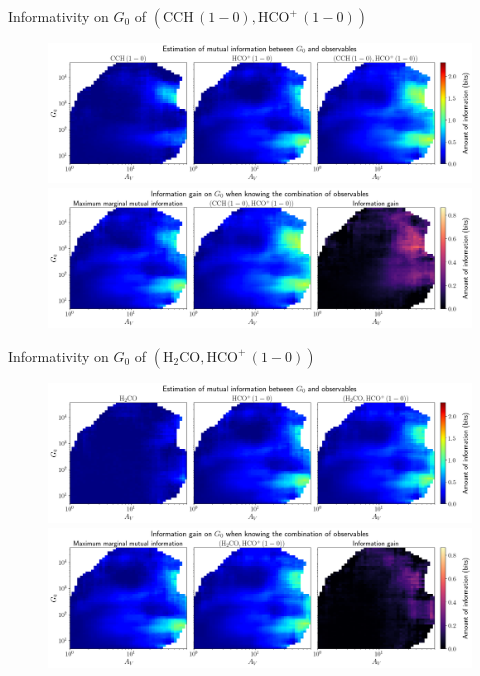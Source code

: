 \documentclass{beamer}
\begin{document}
\begin{frame}{Informativity on $G_0$ of $\left(\mathrm{CCH\,(1-0)},\mathrm{HCO^+\,(1-0)}\right)$}
    \begin{figure}
        \centering
        \includegraphics[width=0.95\linewidth]{../mi/g0__cch10_hcop10_mi.png}
        \vfill
        \includegraphics[width=0.95\linewidth]{../mi/g0__cch10_hcop10_mi_gain.png}
    \end{figure}
\end{frame}

\begin{frame}{Informativity on $G_0$ of $\left(\mathrm{H_2CO},\mathrm{HCO^+\,(1-0)}\right)$}
    \begin{figure}
        \centering
        \includegraphics[width=0.95\linewidth]{../mi/g0__h2co_hcop10_mi.png}
        \vfill
        \includegraphics[width=0.95\linewidth]{../mi/g0__h2co_hcop10_mi_gain.png}
    \end{figure}
\end{frame}
\end{document}

